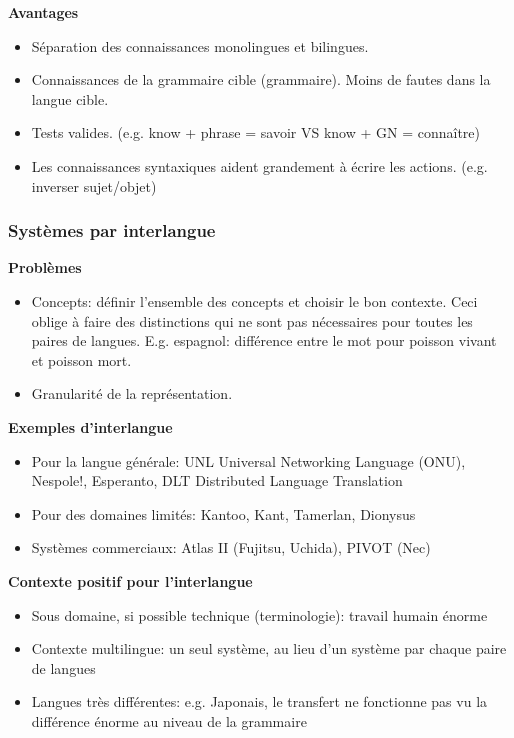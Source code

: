 \textbf{Avantages}

\begin{itemize}
    \item Séparation des connaissances monolingues et bilingues.
    \item Connaissances de la grammaire cible (grammaire). Moins de fautes dans la langue cible.
    \item Tests valides. (e.g. know + phrase = savoir VS know + GN = connaître)
    \item Les connaissances syntaxiques aident grandement à écrire les actions. (e.g. inverser sujet/objet)
\end{itemize}

\newpage

\subsubsection{Systèmes par interlangue}

\textbf{Problèmes}

\begin{itemize}
    \item Concepts: définir l'ensemble des concepts et choisir le bon contexte. Ceci oblige à faire des distinctions qui ne sont pas nécessaires pour toutes les paires de langues. E.g. espagnol: différence entre le mot pour poisson vivant et poisson mort.
    \item Granularité de la représentation.\\
\end{itemize}


\textbf{Exemples d'interlangue}

\begin{itemize}
    \item Pour la langue générale: UNL Universal Networking Language (ONU), Nespole!, Esperanto, DLT Distributed Language Translation
    \item Pour des domaines limités: Kantoo, Kant, Tamerlan, Dionysus
    \item Systèmes commerciaux: Atlas II (Fujitsu, Uchida), PIVOT (Nec)\\
\end{itemize}

\textbf{Contexte positif pour l'interlangue}

\begin{itemize}
    \item Sous domaine, si possible technique (terminologie): travail humain énorme
    \item Contexte multilingue: un seul système, au lieu d'un système par chaque paire de langues
    \item Langues très différentes: e.g. Japonais, le transfert ne fonctionne pas vu la différence énorme au niveau de la grammaire
\end{itemize}
